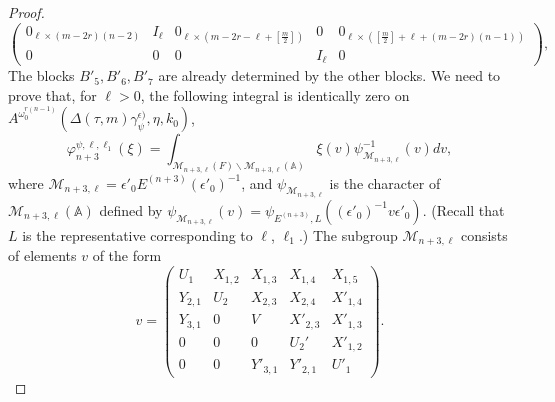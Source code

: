 \documentclass[12pts]{amsart}
\newcommand{\BA}{{\mathbb {A}}}
\begin{document}
\begin{proof}
\begin{equation}\label{11.10}
\begin{pmatrix}0_{\ell\times (m-2r)(n-2)}& I_\ell & 0_{\ell\times (m-2r-\ell+[\frac{m}{2}])}& 0&0_{\ell\times ([\frac{m}{2}]+\ell+(m-2r)(n-1))}\\                        0& 0&       0& I_\ell & 0 \end{pmatrix},
\end{equation}
The blocks $B'_5, B'_6, B'_7$ are already determined by the other blocks. We need to prove that, for $\ell>0$, the following integral is identically zero on $A^{\omega_0^{r(n-1)}}(\Delta(\tau,m)\gamma_\psi^{\epsilon)},\eta,k_0)$,
\begin{equation}\label{11.11}
\varphi_{n+3}^{\psi,\ell,\ell_1}(\xi)=
\int_{\mathcal{M}_{n+3,\ell}(F)\backslash
	\mathcal{M}_{n+3,\ell}(\BA)}\xi(v)\psi^{-1}_{\mathcal{M}_{n+3,\ell}}(v)dv, 
\end{equation}
where $\mathcal{M}_{n+3,\ell}=\epsilon'_0E^{(n+3)}(\epsilon'_0)^{-1}$, and $\psi_{\mathcal{M}_{n+3,\ell}}$ is the character of $\mathcal{M}_{n+3,\ell}(\BA)$ defined by $\psi_{\mathcal{M}_{n+3,\ell}}(v)=\psi_{E^{(n+3)},L}((\epsilon'_0)^{-1}v\epsilon'_0)$. (Recall that $L$ is the representative corresponding to $\ell$, $\ell_1$.) The subgroup $\mathcal{M}_{n+3,\ell}$ consists of elements $v$ of the form 
\begin{equation}\label{11.11.1}
v=\begin{pmatrix}U_1&X_{1,2}&X_{1,3}&X_{1,4}&X_{1,5}\\Y_{2,1}&U_2&X_{2,3}&X_{2,4}&X'_{1,4}\\
Y_{3,1}&0&V&X'_{2,3}&X'_{1,3}\\0&0&0&U_2'&X'_{1,2}\\0&0&Y'_{3,1}&Y'_{2,1}&U'_1\end{pmatrix}.
\end{equation}


\end{proof}
\end{document}
